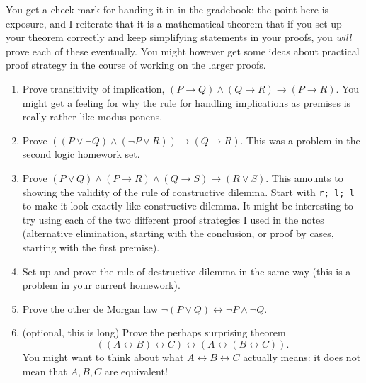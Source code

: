 \documentclass[12pt]{article}
\begin{document}
You get a check mark for handing it in in the gradebook:  the point here is exposure, and I reiterate that it is a mathematical theorem that if you set up your theorem correctly and keep simplifying statements in your proofs, you {\em will\/} prove each of these eventually.  You might however get some ideas about practical proof strategy in the course of working on the larger proofs.

\begin{enumerate}

\item Prove transitivity of implication, $(P \rightarrow Q) \wedge (Q \rightarrow R) \rightarrow (P \rightarrow R)$.  You might get a feeling for why the rule for handling implications as premises is really rather like modus ponens.

\item Prove $((P \vee \neg Q) \wedge (\neg P \vee R)) \rightarrow (Q \rightarrow R)$.  This was a problem in the second logic homework set.

\item Prove $(P \vee Q) \wedge (P \rightarrow R) \wedge (Q \rightarrow S) \rightarrow (R \vee S)$.  This amounts to showing the validity of the rule of constructive dilemma.
Start with {\tt r; l; l} to make it look exactly like constructive dilemma.  It might be interesting to try using each of the two different proof strategies I used in the notes
(alternative elimination, starting with the conclusion, or proof by cases, starting with the first premise).

\item Set up and prove the rule of destructive dilemma in the same way (this is a problem in your current homework).

\item Prove the other de Morgan law  $\neg(P \vee Q) \leftrightarrow \neg P \wedge \neg Q$.

\item (optional, this is long) Prove the perhaps surprising theorem $$((A \leftrightarrow B) \leftrightarrow C) \leftrightarrow (A \leftrightarrow (B \leftrightarrow C)).$$  You might want to think about what
$A \leftrightarrow B \leftrightarrow C$ actually means:  it does not mean that $A,B,C$ are equivalent!



\end{enumerate}
\end{document}
